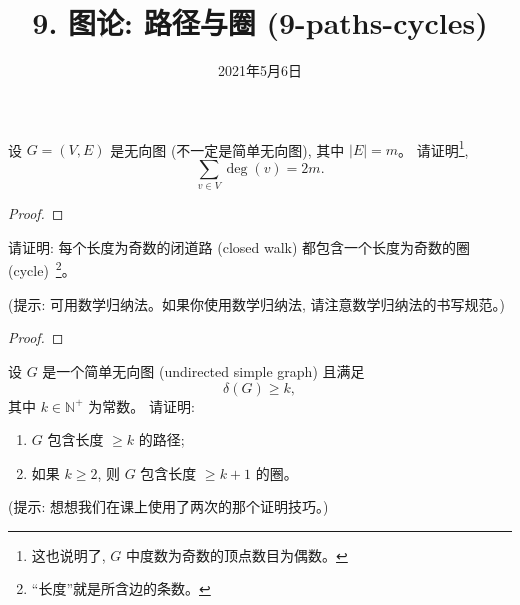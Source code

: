 \documentclass[a4paper, justified]{tufte-handout}
\title{9. 图论: 路径与圈 (9-paths-cycles)}
\date{2021年5月6日}
\begin{document}
\maketitle
\noplagiarism %
\begin{abstract}
\end{abstract}
\beginrequired

\begin{problem}
  设 $G = (V, E)$ 是无向图 (不一定是简单无向图),
  其中 $|E| = m$。
  请证明\footnote{这也说明了, $G$ 中度数为奇数的顶点数目为偶数。},
  \[
    \sum_{v \in V} \deg(v) = 2m.
  \]
\end{problem}

\begin{proof}
\end{proof}

\begin{problem}
  请证明: 每个长度为奇数的闭道路 (closed walk) 都包含一个长度为奇数的圈 (cycle)~\footnote{
    ``长度''就是所含边的条数。}。

  \vspace{1em}
  \noindent (提示: 可用数学归纳法。如果你使用数学归纳法, 请注意数学归纳法的书写规范。)
\end{problem}

\begin{proof}
\end{proof}

\begin{problem}[\score{4 = 2 + 2} $\star\star\star$]
  设 $G$ 是一个简单无向图 (undirected simple graph) 且满足
  \[
    \delta(G) \ge k,
  \]
  其中 $k \in \mathbb{N}^{+}$ 为常数。
  请证明:
  \begin{enumerate}[(1)]
    \item $G$ 包含长度 $\ge k$ 的路径;
    \item 如果 $k \ge 2$, 则 $G$ 包含长度 $\ge k + 1$ 的圈。
  \end{enumerate}

  \vspace{1em}
  \noindent (提示: 想想我们在课上使用了两次的那个证明技巧。)
\end{problem}
\end{document}
